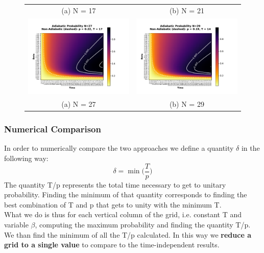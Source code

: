 \documentclass[aps,pra,reprint, onecolumn, showkeys]{revtex4-2}
\begin{document}
\begin{figure}
\begin{tabular}{cc}
(a) N = 17 & (b) N = 21\\[6pt]
\includegraphics[width=90mm]{./figures/27_probability_heatmap.pdf} &   \includegraphics[width=90mm]{./figures/29_probability_heatmap.pdf} \\
(a) N = 27 & (b) N = 29\\[6pt]
\end{tabular}
\end{figure}


\subsubsection{Numerical Comparison}
In order to numerically compare the two approaches we define a quantity $\delta$ in the following way:
\begin{equation}
  \delta = \min\Big(\frac{T}{p}\Big)
\end{equation}
The quantity T/p represents the total time necessary to get to unitary probability. Finding the minimum of that quantity corresponds to finding the best combination of T and p that gets to unity with the minimum T. \\

What we do is thus for each vertical column of the grid, i.e. constant T and variable $\beta$, computing the maximum probability and finding the quantity T/p. We than find the minimum of all the T/p calculated. In this way we \textbf{reduce a grid to a single value} to compare to the time-independent results. \\
\end{document}

